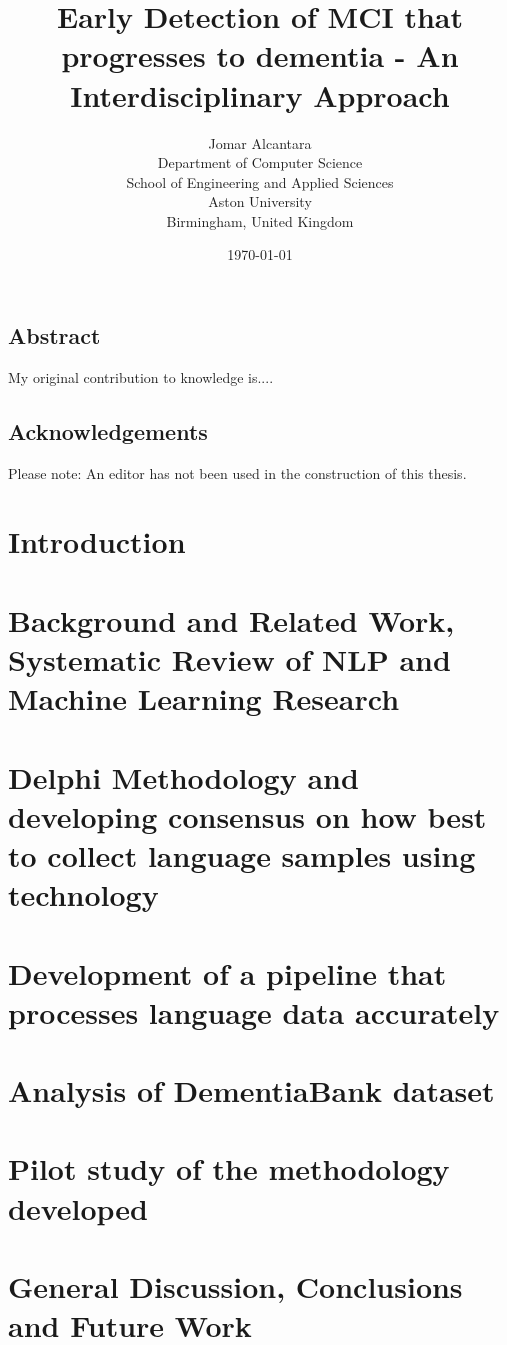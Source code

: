 \documentclass[10pt, letterpaper, twoside, openany]{book}
\title{Early Detection of MCI that progresses to dementia - An Interdisciplinary Approach}
\author{
        Jomar Alcantara \\
        Department of Computer Science \\
        School of Engineering and Applied Sciences \\
        Aston University\\
        Birmingham, United Kingdom
}
\date{\today}
\begin{document}
\maketitle
\newpage
\section*{Abstract}
My original contribution to knowledge is....
\newpage
\section*{Acknowledgements}
Please note: An editor has not been used in the construction of this thesis.
\newpage
\tableofcontents
\newpage
\listoffigures
\listoftables

\chapter{Introduction}


\chapter{Background and Related Work, Systematic Review of NLP and Machine Learning Research}


\chapter{Delphi Methodology and developing consensus on how best to collect language samples using technology}


\chapter{Development of a pipeline that processes language data accurately}


\chapter{Analysis of DementiaBank dataset}


\chapter{Pilot study of the methodology developed}


\chapter{General Discussion, Conclusions and Future Work}




\end{document}
